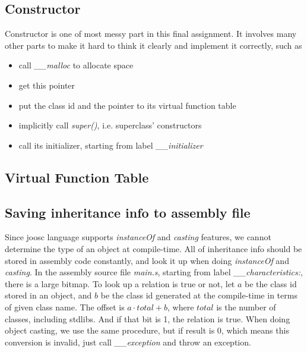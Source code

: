 \documentclass[12pt,letterpaper]{article}
\begin{document}
\subsection{Constructor}
Constructor is one of most messy part in this final assignment.
It involves many other parts to make it hard to think it clearly and implement it correctly, such as
\begin{itemize}
\item call \emph{\_\_malloc} to allocate space
\item get this pointer
\item put the class id and the pointer to its virtual function table
\item implicitly call \emph{super()}, i.e. superclass' constructors
\item call its initializer, starting from label \emph{\_\_initializer}
\end{itemize}

\subsection{Virtual Function Table}

\subsection{Saving inheritance info to assembly file}
Since joosc language supports \emph{instanceOf} and \emph{casting} features, we cannot determine the type of an object at compile-time.
All of inheritance info should be stored in assembly code constantly, and look it up when doing \emph{instanceOf} and \emph{casting}.
In the assembly source file \emph{main.s}, starting from label \emph{\_\_characteristics:}, there is a large bitmap.
To look up a relation is true or not, let $a$ be the class id stored in an object, and $b$ be the class id generated at the compile-time in terms of given class name.
The offset is $a \cdot total + b$, where $total$ is the number of classes, including stdlibs.
And if that bit is 1, the relation is true.
When doing object casting, we use the same procedure, but if result is 0, which means this conversion is invalid, just call \emph{\_\_exception} and throw an exception.
\end{document}
